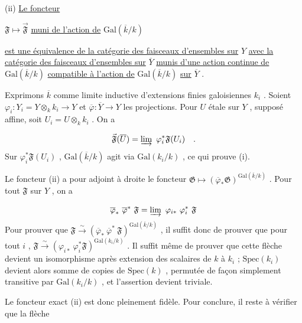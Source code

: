 
(ii) \underline{Le foncteur}

$\mathfrak{F} \longmapsto \vec{\mathfrak{F}}$ \underline{muni de l'action de} $\mathrm{Gal}(\overline{k}/k)$

\underline{est une équivalence de la catégorie des faisceaux d'ensembles sur} $Y$ \underline{avec la catégorie des faisceaux d'ensembles sur} $\overline{Y}$ \underline{munis d'une action continue de} $\mathrm{Gal}(\overline{k}/k)$ \underline{compatible à l'action de} $\mathrm{Gal}(\overline{k}/k)$ \underline{sur} $\overline{Y}$ .

Exprimons $\overline{k}$ comme limite inductive d'extensions finies galoisiennes $k_i$ . Soient $\varphi_i : Y_i = Y \otimes_k k_i \longrightarrow Y$ et $\overline{\varphi} : \overline{Y} \longrightarrow Y$ les projections. Pour $U$ étale sur $Y$ , supposé affine, soit $U_i = U \otimes_k k_i$ . On a

\begin{equation*}
\vec{\mathfrak{F}}(\overline{U}) = \varinjlim \ \varphi_i^* \mathfrak{F}(U_i) \quad .
\end{equation*}
Sur $\varphi_i^* \mathfrak{F}(U_i)$ , $\mathrm{Gal}(\overline{k}/k)$ agit via $\mathrm{Gal}(k_i/k)$ , ce qui prouve (i).

Le foncteur (ii) a pour adjoint à droite le foncteur $\mathfrak{G} \longmapsto (\overline{\varphi}_* \mathfrak{G})^{\mathrm{Gal}(\overline{k}/k)}$ . Pour tout $\mathfrak{F}$ sur $Y$ , on a

\begin{equation*}
\overline{\varphi}_* \ \overline{\varphi}^* \ \mathfrak{F} = \varinjlim \ \varphi_{i*} \ \varphi_i^* \ \mathfrak{F}
\end{equation*}
Pour prouver que $\mathfrak{F} \overset{\sim}{\longrightarrow} (\overline{\varphi}_* \ \overline{\varphi}^* \ \mathfrak{F})^{\mathrm{Gal}(\overline{k}/k)}$ , il suffit donc de prouver que pour tout $i$ , $\mathfrak{F} \overset{\sim}{\longrightarrow} (\varphi_{i*} \ \varphi_i^* \mathfrak{F})^{\mathrm{Gal}(k_i/k)}$ . Il suffit même de prouver que cette flèche devient un isomorphisme après extension des scalaires de $k$ à $k_i$ ; $\mathrm{Spec}(k_i)$ devient alors somme de copies de $\mathrm{Spec}(k)$ , permutée de façon simplement transitive par $\mathrm{Gal}(k_i/k)$ , et l'assertion devient triviale.

Le foncteur exact (ii) est donc pleinement fidèle. Pour conclure, il reste à vérifier que la flèche

